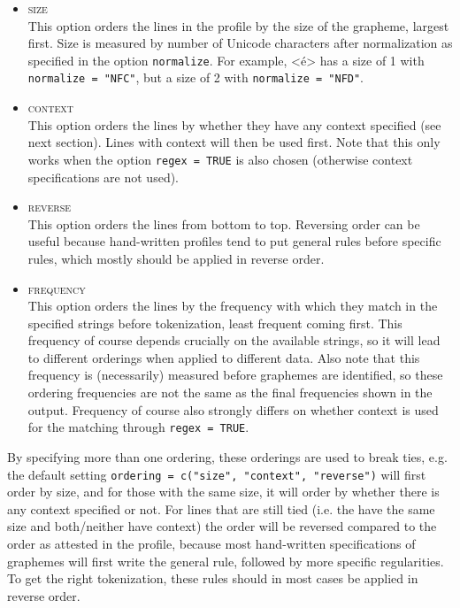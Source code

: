 \begin{itemize}
  
   \item \textsc{size}\\
         This option orders the lines in the profile by the size of the
         grapheme, largest first. Size is measured by number of Unicode
         characters after normalization as specified in the option
         \texttt{normalize}. For example, <é> has a size of 1 with
         \texttt{normalize = "NFC"}, but a size of 2 with
         \texttt{normalize = "NFD"}.

   \item \textsc{context}\\ This option orders the lines by whether they have
           any context specified (see next section). Lines with context will
           then be used first. Note that this only works when the option
           \texttt{regex = TRUE} is also chosen (otherwise context
           specifications are not used).

   \item \textsc{reverse}\\ This option orders the lines from bottom to top.
         Reversing order can be useful because hand-written profiles tend to put
         general rules before specific rules, which mostly should be applied in
         reverse order.

  \item \textsc{frequency}\\
         This option orders the lines by the frequency with which they
         match in the specified strings before tokenization, least frequent
         coming first. This frequency of course depends crucially on the
         available strings, so it will lead to different orderings when applied
         to different data. Also note that this frequency is (necessarily)
         measured before graphemes are identified, so these ordering frequencies
         are not the same as the final frequencies shown in the output.
         Frequency of course also strongly differs on whether context is used
         for the matching through \texttt{regex = TRUE}.
  
\end{itemize}

By specifying more than one ordering, these orderings are used to break ties,
e.g. the default setting \texttt{ordering = c("size", "context", "reverse")}
will first order by size, and for those with the same size, it will order by
whether there is any context specified or not. For lines that are still tied
(i.e. the have the same size and both/neither have context) the order will be
reversed compared to the order as attested in the profile, because most
hand-written specifications of graphemes will first write the general rule,
followed by more specific regularities. To get the right tokenization, these 
rules should in most cases be applied in reverse order.

